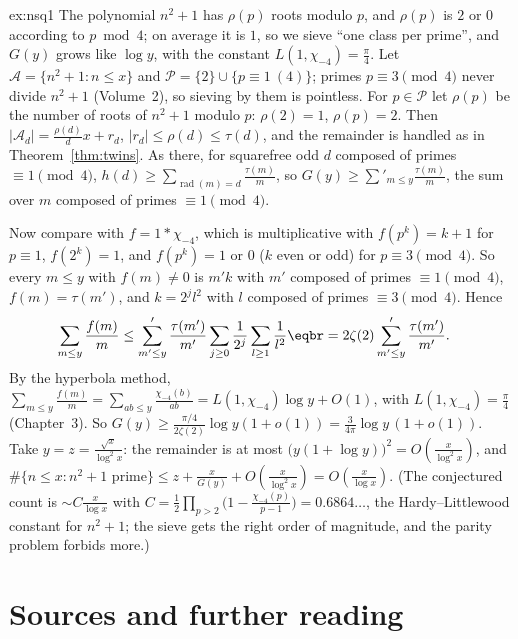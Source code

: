 \begin{solution}{ex:nsq1}
\idea The polynomial $n^2+1$ has $\rho(p)$ roots modulo $p$, and $\rho(p)$ is $2$ or $0$ according to $p\bmod4$; on average it is $1$, so we sieve ``one class per prime'', and $G(y)$ grows like $\log y$, with the constant $L(1,\chi_{-4})=\frac\pi4$.
\writeup Let $\mathcal A=\{n^2+1:n\le x\}$ and $\mathcal P=\{2\}\cup\{p\equiv1\ (4)\}$; primes $p\equiv3\pmod4$ never divide $n^2+1$ (Volume~2), so sieving by them is pointless. For $p\in\mathcal P$ let $\rho(p)$ be the number of roots of $n^2+1$ modulo
$p$: $\rho(2)=1$, $\rho(p)=2$. Then $|\mathcal A_d|=\frac{\rho(d)}dx+r_d$, $|r_d|\le\rho(d)\le\tau(d)$, and the remainder is handled as in Theorem~\ref{thm:twins}. As there, for squarefree odd $d$ composed of primes $\equiv1\pmod4$,
$h(d)\ge\sum_{\operatorname{rad}(m)=d}\frac{\tau(m)}m$, so $G(y)\ge\sum'_{m\le y}\frac{\tau(m)}m$, the sum over $m$ composed of primes $\equiv1\pmod4$.

Now compare with $f=1*\chi_{-4}$, which is multiplicative with $f(p^k)=k+1$ for $p\equiv1$, $f(2^k)=1$, and $f(p^k)=1$ or $0$ ($k$ even or odd) for $p\equiv3\pmod4$. So every $m\le y$ with $f(m)\ne0$ is $m'k$ with $m'$ composed of primes
$\equiv1\pmod4$, $f(m)=\tau(m')$, and $k=2^jl^2$ with $l$ composed of primes $\equiv3\pmod4$. Hence
\[
\begin{aligned}\sum_{m\le y}\frac{f(m)}m&\le\sum'_{m'\le y}\frac{\tau(m')}{m'}\sum_{j\ge0}\frac1{2^j}\sum_{l\ge1}\frac1{l^2}\eqbr=2\zeta(2)\sum'_{m'\le y}\frac{\tau(m')}{m'}.\end{aligned}
\]
By the hyperbola method, $\sum_{m\le y}\frac{f(m)}m=\sum_{ab\le y}\frac{\chi_{-4}(b)}{ab}=L(1,\chi_{-4})\log y+O(1)$, with $L(1,\chi_{-4})=\frac\pi4$ (Chapter~3). So $G(y)\ge\frac{\pi/4}{2\zeta(2)}\log y(1+o(1))=\frac3{4\pi}\log y\,(1+o(1))$.
Take $y=z=\frac{\sqrt x}{\log^2x}$: the remainder is at most $\bigl(y(1+\log y)\bigr)^2=O(\frac x{\log^2x})$, and
$\#\{n\le x:n^2+1\text{ prime}\}\le z+\frac x{G(y)}+O(\frac x{\log^2x})=O(\frac x{\log x})$. (The conjectured count is $\sim C\frac x{\log x}$ with $C=\frac12\prod_{p>2}\bigl(1-\frac{\chi_{-4}(p)}{p-1}\bigr)=0.6864\ldots$, the
Hardy--Littlewood constant for $n^2+1$; the sieve gets the right order of magnitude, and the parity problem forbids more.)
\end{solution}

\section*{Sources and further reading}

